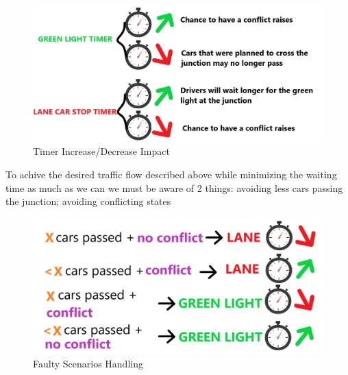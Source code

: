 \documentclass[17pt]{report}
\begin{document}
\begin{figure}[h!]
    \includegraphics[width=\textwidth]{Sketches/TimerIncreaseDecreaseImpact.png}
    \caption{Timer Increase/Decrease Impact}
    \label{fig:Timer Increase/Decrease Impact}
\end{figure}

To achive the desired traffic flow described above while minimizing
the waiting time as much as we can we must be aware of 2 things:
avoiding less cars passing the junction; avoiding conflicting states

\begin{figure}[h!]
    \includegraphics[width=\textwidth]{Sketches/FaultyScenariosHandling.png}
    \caption{Faulty Scenarios Handling}
    \label{fig:Faulty Scenarios Handling}
\end{figure}
\end{document}

